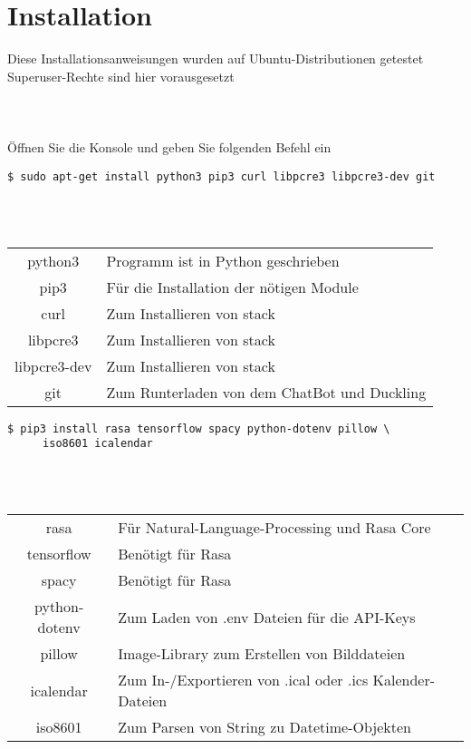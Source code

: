 \chapter{Installation}

Diese Installationsanweisungen wurden auf Ubuntu-Distributionen getestet\\
Superuser-Rechte sind hier vorausgesetzt\\
\\
\\
\\
Öffnen Sie die Konsole und geben Sie folgenden Befehl ein\\

\begin{framed}
\texttt{\$ sudo apt-get install python3 pip3 curl libpcre3 libpcre3-dev git}
\end{framed}
\hfill\\\\
\begin{tabular}{cl}
	python3 & Programm ist in Python geschrieben\\
	pip3 & Für die Installation der nötigen Module\\
	curl & Zum Installieren von stack \\
	libpcre3 & Zum Installieren von stack \\
	libpcre3-dev & Zum Installieren von stack \\
	git & Zum Runterladen von dem ChatBot und Duckling \\
\end{tabular}
\newpage
\begin{framed}
\texttt{\$ pip3 install rasa tensorflow spacy python-dotenv pillow \textbackslash \\ $\phantom{.}\qquad$ iso8601  icalendar}
\end{framed}
\hfill\\\\
\begin{tabular}{cl}
	rasa & Für Natural-Language-Processing und Rasa Core\\
	tensorflow & Benötigt für Rasa\\
	spacy & Benötigt für Rasa\\
	python-dotenv & Zum Laden von .env Dateien für die API-Keys \\
	pillow & Image-Library zum Erstellen von Bilddateien \\
	icalendar & Zum In-/Exportieren von .ical oder .ics Kalender-Dateien \\
	iso8601 & Zum Parsen von String zu Datetime-Objekten 
\end{tabular}
